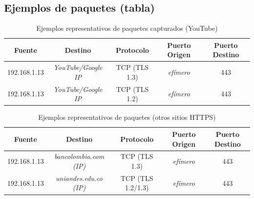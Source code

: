 \documentclass[10pt]{article}
\begin{document}
\subsection*{Ejemplos de paquetes (tabla)}
\begin{table}[H]
\centering
\caption{Ejemplos representativos de paquetes capturados (YouTube)}
\begin{tabular}{|c|c|c|c|c|}
\hline
\textbf{Fuente} & \textbf{Destino} & \textbf{Protocolo} & \textbf{Puerto Origen} & \textbf{Puerto Destino} \\
\hline
192.168.1.13 & \textit{YouTube/Google IP} & TCP (TLS 1.3) & \textit{efímero} & 443 \\
192.168.1.13 & \textit{YouTube/Google IP} & TCP (TLS 1.2) & \textit{efímero} & 443 \\
\hline
\end{tabular}
\end{table}

\begin{table}[H]
\centering
\caption{Ejemplos representativos de paquetes (otros sitios HTTPS)}
\begin{tabular}{|c|c|c|c|c|}
\hline
\textbf{Fuente} & \textbf{Destino} & \textbf{Protocolo} & \textbf{Puerto Origen} & \textbf{Puerto Destino} \\
\hline
192.168.1.13 & \textit{bancolombia.com (IP)} & TCP (TLS 1.3) & \textit{efímero} & 443 \\
192.168.1.13 & \textit{uniandes.edu.co (IP)} & TCP (TLS 1.2/1.3) & \textit{efímero} & 443 \\
\hline
\end{tabular}
\end{table}

\end{document}
